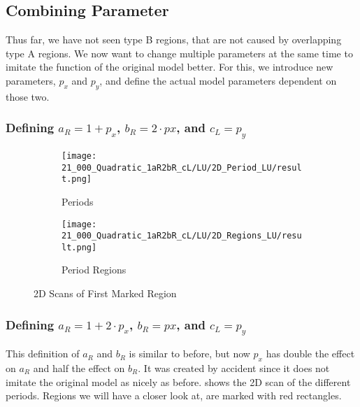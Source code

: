 \subsection{Combining Parameter}

Thus far, we have not seen type B regions, that are not caused by overlapping type A regions.
We now want to change multiple parameters at the same time to imitate the function of the original model better.
For this, we introduce new parameters, $p_x$ and $p_y$, and define the actual model parameters dependent on those two.

\subsubsection{Defining $a_R = 1 + p_x$, $b_R = 2 \cdot px$, and $c_L = p_y$}


\begin{figure}
    \centering
    \begin{subfigure}{0.4\textwidth}
        \centering
        \texttt{[image: 21\_000\_Quadratic\_1aR2bR\_cL/LU/2D\_Period\_LU/result.png]}
        \caption{Periods}
        \label{fig:quadratic.full.1aR2bR_cL.2d.1}
    \end{subfigure}
    \begin{subfigure}{0.4\textwidth}
        \centering
        \texttt{[image: 21\_000\_Quadratic\_1aR2bR\_cL/LU/2D\_Regions\_LU/result.png]}
        \caption{Period Regions}
        \label{fig:quadratic.regions.1aR2bR_cL.2d.1}
    \end{subfigure}
    \caption{2D Scans of First Marked Region}
\end{figure}




\subsubsection{Defining $a_R = 1 + 2 \cdot p_x$, $b_R = px$, and $c_L = p_y$}

This definition of $a_R$ and $b_R$ is similar to before, but now $p_x$ has double the effect on $a_R$ and half the effect on $b_R$.
It was created by accident since it does not imitate the original model as nicely as before.
 shows the 2D scan of the different periods.
Regions we will have a closer look at, are marked with red rectangles.

